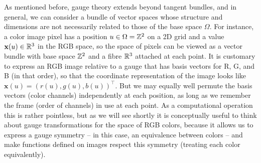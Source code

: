 
As mentioned before, gauge theory extends beyond tangent bundles, and in general, we can consider a bundle of vector spaces whose structure and dimensions are not necessarily related to those of the base space $\Omega$.  
For instance, a color image pixel has a position $u \in \Omega = \mathbb{Z}^2$ on a 2D grid and a value $\mathbf{x}(u) \in \mathbb{R}^3$ in the RGB space, so the space of pixels can be viewed as a vector bundle with base space $\mathbb{Z}^2$ and a fibre $\mathbb{R}^3$ attached at each point. 
%
It is customary to express an RGB image relative to a gauge that has basis vectors for R, G, and B (in that order), so that the coordinate representation of the image looks like $\mathbf{x}(u) = (r(u), g(u), b(u))^\top$.
But we may equally well permute the basis vectors (color channels) independently at each position, as long as we remember the frame (order of channels) in use at each point.
As a computational operation this is rather pointless, but as we will see shortly it is conceptually useful to think about gauge transformations for the space of RGB colors, because it allows us to express a gauge symmetry -- in this case, an equivalence between colors -- and make functions defined on images respect this symmetry (treating each color equivalently). 




